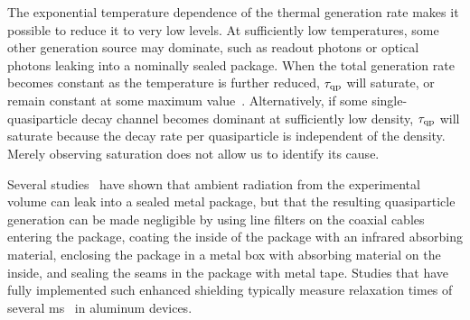 The exponential temperature dependence of the thermal generation rate makes it possible to reduce it to very low levels.
At sufficiently low temperatures, some other generation source may dominate, such as readout photons or optical photons leaking into a nominally sealed package.
When the total generation rate becomes constant as the temperature is further reduced, $\tau_{\mathrm{qp}}$ will saturate, or remain constant at some maximum value~\autocite{deVisser2011PRL}.
Alternatively, if some single-quasiparticle decay channel becomes dominant at sufficiently low density, $\tau_{\mathrm{qp}}$ will saturate because the decay rate per quasiparticle is independent of the density.
Merely observing saturation does not allow us to identify its cause.

Several studies~\autocite{Baselmans2009AIPC, Barends2011APL, Corcoles2011APL, Barends2011APL, Kreikebaum2016SUST} have shown that ambient radiation from the experimental volume can leak into a sealed metal package, but that the resulting quasiparticle generation can be made negligible by using line filters on the coaxial cables entering the package, coating the inside of the package with an infrared absorbing material, enclosing the package in a metal box with absorbing material on the inside, and sealing the seams in the package with metal tape.
Studies that have fully implemented such enhanced shielding typically measure relaxation times of several \si{ms}~\autocite{Baselmans2009AIPC,deVisser2014NatComm}
in aluminum devices.


